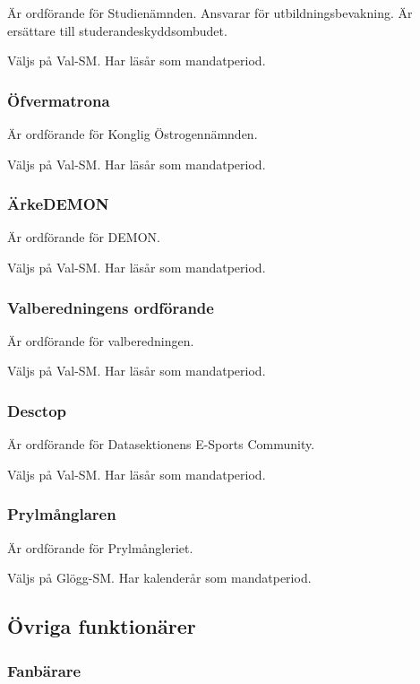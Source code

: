 \documentclass{dgovdoc}
\begin{document}
Är ordförande för Studienämnden. Ansvarar för utbildningsbevakning. Är
ersättare till studerandeskyddsombudet.

Väljs på Val-SM. Har läsår som mandatperiod.

\subsubsection{Öfvermatrona}

Är ordförande för Konglig Östrogennämnden.

Väljs på Val-SM. Har läsår som mandatperiod.

\subsubsection{ÄrkeDEMON}

Är ordförande för DEMON.

Väljs på Val-SM. Har läsår som mandatperiod.

\subsubsection{Valberedningens ordförande}

Är ordförande för valberedningen.

Väljs på Val-SM. Har läsår som mandatperiod.

\subsubsection{Desctop}

Är ordförande för Datasektionens E-Sports Community.

Väljs på Val-SM. Har läsår som mandatperiod.

\subsubsection{Prylmånglaren}
Är ordförande för Prylmångleriet.

Väljs på Glögg-SM. Har kalenderår som mandatperiod.

\subsection{Övriga funktionärer}

\subsubsection{Fanbärare}
\end{document}
